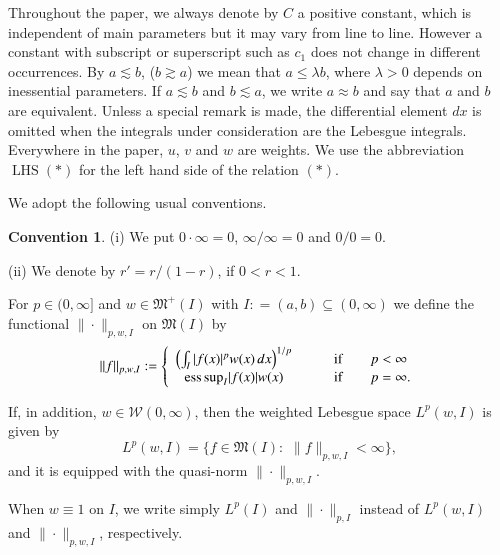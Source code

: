 \documentclass[12pt]{amsart}
\theoremstyle{plain}
\theoremstyle{definition}
\newtheorem{conv}[thm]{Convention}
\numberwithin{thm}{section}
\numberwithin{equation}{section}
\begin{document}
Throughout the paper, we always denote by $C$ a positive
constant, which is independent of main parameters but it may vary
from line to line. However a constant with subscript or superscript such as $c_1$
does not change in different occurrences. By $a\lesssim b$,
($b\gtrsim a$) we mean that $a\leq \lambda b$, where $\lambda >0$ depends on
inessential parameters. If $a\lesssim b$ and $b\lesssim a$, we write
$a\approx b$ and say that $a$ and $b$ are  equivalent. Unless a
special remark is made, the differential element $dx$ is omitted
when the integrals under consideration are the Lebesgue integrals.
Everywhere in the paper, $u$, $v$ and $w$ are weights. We use the
abbreviation ${\operatorname{LHS}} (*)$ for the left hand side
of the relation $(*)$.

We adopt the following usual conventions.
\begin{conv}\label{Notat.and.prelim.conv.1.1}
	{\rm (i)} We put $0 \cdot \infty = 0$, $\infty / \infty =
	0$ and $0/0 = 0$.
	
	{\rm (ii)} We denote by $r' = r / (1- r )$, if $0 < r < 1$.
\end{conv}

For $p\in (0,\infty]$ and $w\in {\mathfrak M}^+(I)$ with $I : = (a,b)\subseteq (0,\infty)$ we define the functional
$\|\cdot\|_{p,w,I}$ on ${\mathfrak M} (I)$ by
\begin{equation*}
\|f\|_{p,w,I} : = \left\{\begin{array}{cl}
\left(\int_I |f(x)|^p w(x)\,dx \right)^{1/p} & \qquad\mbox{if}\qquad p<\infty \\
{\operatornamewithlimits{ess\,sup}}_{I} |f(x)|w(x) & \qquad\mbox{if}\qquad p=\infty.
\end{array}
\right.
\end{equation*}

If, in addition, $w\in {\mathcal W}{(0,\infty)}$, then the weighted Lebesgue space
$L^p(w,I)$ is given by
\begin{equation*}
L^p(w,I) = \{f\in {\mathfrak M} (I):\,\, \|f\|_{p,w,I} < \infty\},
\end{equation*}
and it is equipped with the quasi-norm $\|\cdot\|_{p,w,I}$.

When $w\equiv 1$ on $I$, we write simply $L^p(I)$ and
$\|\cdot\|_{p,I}$ instead of $L^p(w,I)$ and $\|\cdot\|_{p,w,I}$,
respectively.
\end{document}
